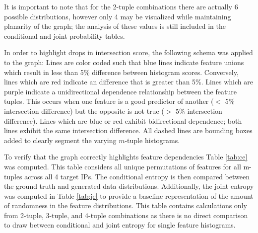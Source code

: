 It is important to note that for the 2-tuple combinations there are actually 6 possible distributions, however only 4 may be visualized while maintaining planarity of the graph; the analysis of these values is still included in the conditional and joint probability tables.

In order to highlight drops in intersection score, the following schema was applied to the graph: Lines are color coded such that blue lines indicate feature unions which result in less than 5\% difference between histogram scores. Conversely, lines which are red indicate an difference that is greater than 5\%. Lines which are purple indicate a unidirectional dependence relationship between the feature tuples. This occurs when one feature is a good predictor of another ($<$ 5\% intersection difference) but the opposite is not true ($>$ 5\% intersection difference). Lines which are blue or red exhibit bidirectional dependence; both lines exhibit the same intersection difference. All dashed lines are bounding boxes added to clearly segment the varying $m$-tuple histograms.

To verify that the graph correctly highlights feature dependencies Table \ref{tab:ce} was computed. This table considers all unique permutations of features for all m-tuples across all 4 target IPs. The conditional entropy is then compared between the ground truth and generated data distributions. Additionally, the joint entropy was computed in Table \ref{tab:je} to provide a baseline representation of the amount of randomness in the feature distributions. This table contains calculations only from 2-tuple, 3-tuple, and 4-tuple combinations as there is no direct comparison to draw between conditional and joint entropy for single feature histograms.


